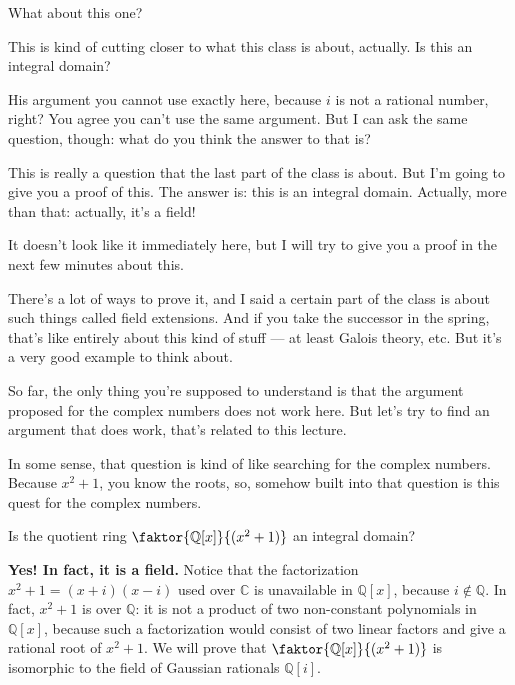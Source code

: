 \begin{speech}[01:18:56 - 01:20:11]
What about this one?  

This is kind of cutting closer to what this class is about, actually. Is this an integral domain? 

His argument you cannot use exactly here, because $i$ is not a rational number, right? You agree you can't use the same argument. But I can ask the same question, though: what do you think the answer to that is? 

This is really a question that the last part of the class is about. But I'm going to give you a proof of this. The answer is: this is an integral domain.  Actually, more than that:  actually, it's a field! 

It doesn't look like it immediately here, but I will try to give you a proof in the next few minutes about this. 

There's a lot of ways to prove it, and I said a certain part of the class is about such things called field extensions. And if you take the successor in the spring, that's like entirely about this kind of stuff --- at least Galois theory, etc. But it's a very good example to think about.
\end{speech}

\begin{speech}[01:20:11 - 01:20:56]
So far, the only thing you're supposed to understand is that the argument proposed for the complex numbers does not work here. But let's try to find an argument that does work, that's related to this lecture. 

In some sense, that question is kind of like searching for the complex numbers. Because $x^2 + 1$, you know the roots, so, somehow built into that question is this quest for the complex numbers.
\end{speech}

\begin{content}
\begin{question}
Is the quotient ring $\faktor{\mathbb{Q}[x]}{(x^2 + 1)}$ an integral domain?
\end{question}

\begin{answer}
\textbf{Yes! In fact, it is a field.}
Notice that the factorization $x^2 + 1 = (x + i)(x - i)$ used over $\mathbb{C}$ is unavailable in $\mathbb{Q}[x]$, because $i \notin \mathbb{Q}$. In fact, $x^2 + 1$ is  over $\mathbb{Q}$: it is not a product of two non-constant polynomials in $\mathbb{Q}[x]$, because such a factorization would consist of two linear factors and give a rational root of $x^2 + 1$. We will prove that $\faktor{\mathbb{Q}[x]}{(x^2 + 1)}$ is isomorphic to the field of Gaussian rationals $\mathbb{Q}[i]$.
\end{answer}
\end{content}

